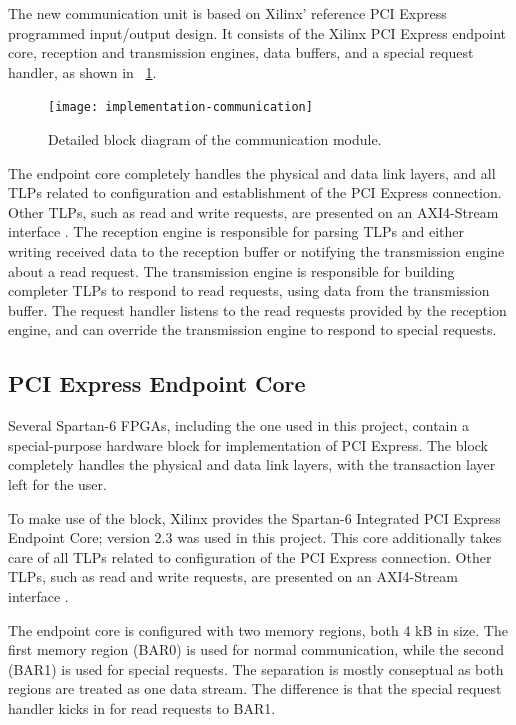 The new communication unit is based on Xilinx' reference PCI Express programmed input/output design.
It consists of the Xilinx PCI Express endpoint core, reception and transmission engines, data buffers, and a special request handler, as shown in \figurename~\ref{fig:implementation-communication}.

\begin{figure}[!ht]
    \centering
    \texttt{[image: implementation-communication]}
    \caption[Communication module]{
        Detailed block diagram of the communication module.
    }
    \label{fig:implementation-communication}
\end{figure}

The endpoint core completely handles the physical and data link layers, and all TLPs related to configuration and establishment of the PCI Express connection.
Other TLPs, such as read and write requests, are presented on an AXI4-Stream interface \cite{ug672}.
The reception engine is responsible for parsing TLPs and either writing received data to the reception buffer or notifying the transmission engine about a read request.
The transmission engine is responsible for building completer TLPs to respond to read requests, using data from the transmission buffer.
The request handler listens to the read requests provided by the reception engine, and can override the transmission engine to respond to special requests.

\subsection{PCI Express Endpoint Core}

Several Spartan-6 FPGAs, including the one used in this project, contain a special-purpose hardware block for implementation of PCI Express.
The block completely handles the physical and data link layers, with the transaction layer left for the user.

To make use of the block, Xilinx provides the Spartan-6 Integrated PCI Express Endpoint Core; version 2.3 was used in this project.
This core additionally takes care of all TLPs related to configuration of the PCI Express connection.
Other TLPs, such as read and write requests, are presented on an AXI4-Stream interface \cite{ug672}.

The endpoint core is configured with two memory regions, both 4 kB in size\footnotemark.
The first memory region (BAR0) is used for normal communication, while the second (BAR1) is used for special requests.
The separation is mostly conseptual as both regions are treated as one data stream.
The difference is that the special request handler kicks in for read requests to BAR1.

